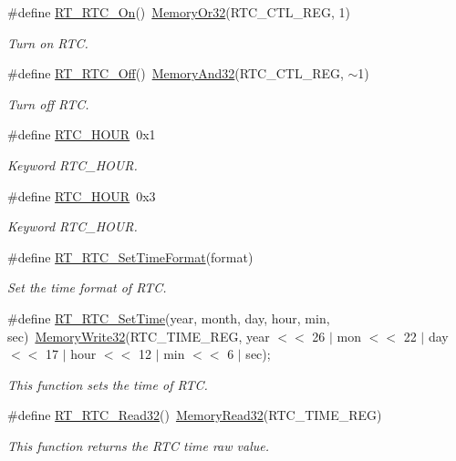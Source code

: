 \begin{DoxyCompactItemize}
\item 
\#define \mbox{\hyperlink{a00053_abcec88fd1699e238435a90f1b49f01fc}{R\+T\+\_\+\+R\+T\+C\+\_\+\+On}}()~\mbox{\hyperlink{a00020_a9ea92ebccdef6bdaca4d00210cc7266d}{Memory\+Or32}}(R\+T\+C\+\_\+\+C\+T\+L\+\_\+\+R\+EG, 1)
\begin{DoxyCompactList}\small\item\em Turn on R\+TC. \end{DoxyCompactList}\item 
\#define \mbox{\hyperlink{a00053_ad065bdfa3138a773950a7d5e9e9f863a}{R\+T\+\_\+\+R\+T\+C\+\_\+\+Off}}()~\mbox{\hyperlink{a00020_a5c1a2bd4c1bd4c2f429d8042a45327ff}{Memory\+And32}}(R\+T\+C\+\_\+\+C\+T\+L\+\_\+\+R\+EG, $\sim$1)
\begin{DoxyCompactList}\small\item\em Turn off R\+TC. \end{DoxyCompactList}\item 
\#define \mbox{\hyperlink{a00053_a6023ebffc90fff4ba8131242c8f4e1ed}{R\+T\+C\+\_\+H\+O\+UR}}~0x1
\begin{DoxyCompactList}\small\item\em Keyword R\+T\+C\+\_\+H\+O\+UR. \end{DoxyCompactList}\item 
\#define \mbox{\hyperlink{a00053_a4bb66ada65a9c9df51dd50402f75e35e}{R\+T\+C\+\_\+H\+O\+UR}}~0x3
\begin{DoxyCompactList}\small\item\em Keyword R\+T\+C\+\_\+H\+O\+UR. \end{DoxyCompactList}\item 
\#define \mbox{\hyperlink{a00053_a4342706ea208fe0adff35bfa3c78b87c}{R\+T\+\_\+\+R\+T\+C\+\_\+\+Set\+Time\+Format}}(format)
\begin{DoxyCompactList}\small\item\em Set the time format of R\+TC. \end{DoxyCompactList}\item 
\#define \mbox{\hyperlink{a00053_a8929da3f9ad422dd07f18d603c63b7b7}{R\+T\+\_\+\+R\+T\+C\+\_\+\+Set\+Time}}(year,  month,  day,  hour,  min,  sec)~\mbox{\hyperlink{a00020_ad9953f631a539cfaa35baf94f878b3ec}{Memory\+Write32}}(R\+T\+C\+\_\+\+T\+I\+M\+E\+\_\+\+R\+EG, year $<$$<$ 26 $\vert$ mon $<$$<$ 22 $\vert$ day $<$$<$ 17 $\vert$ hour $<$$<$ 12 $\vert$ min $<$$<$ 6 $\vert$ sec);
\begin{DoxyCompactList}\small\item\em This function sets the time of R\+TC. \end{DoxyCompactList}\item 
\#define \mbox{\hyperlink{a00053_a61ac395d30cde55137bf04acaec570f0}{R\+T\+\_\+\+R\+T\+C\+\_\+\+Read32}}()~\mbox{\hyperlink{a00020_a706b02571285f92589fbb0b964d7d0bb}{Memory\+Read32}}(R\+T\+C\+\_\+\+T\+I\+M\+E\+\_\+\+R\+EG)
\begin{DoxyCompactList}\small\item\em This function returns the R\+TC time raw value. \end{DoxyCompactList}\end{DoxyCompactItemize}
